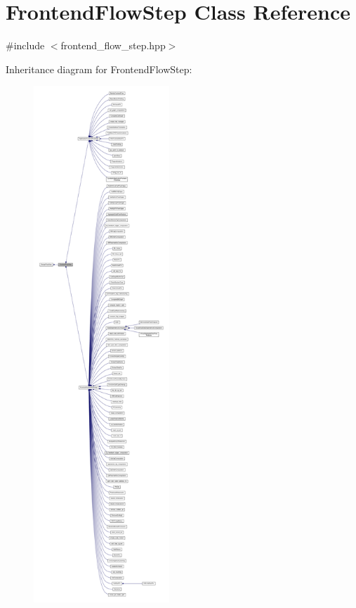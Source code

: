 \hypertarget{classFrontendFlowStep}{}\section{Frontend\+Flow\+Step Class Reference}
\label{classFrontendFlowStep}


{\ttfamily \#include $<$frontend\+\_\+flow\+\_\+step.\+hpp$>$}



Inheritance diagram for Frontend\+Flow\+Step\+:
\nopagebreak
\begin{figure}[H]
\begin{center}
\leavevmode
\includegraphics[height=550pt]{d5/d75/classFrontendFlowStep__inherit__graph}
\end{center}
\end{figure}


